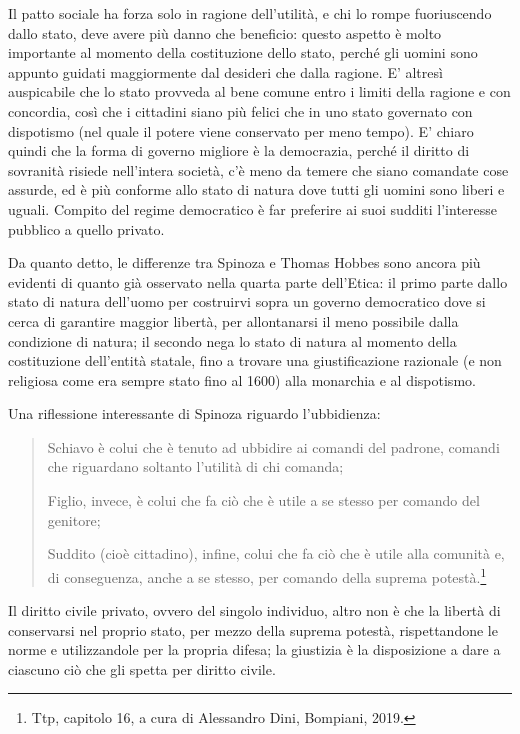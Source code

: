 Il patto sociale ha forza solo in ragione dell'utilità, e chi lo rompe fuoriuscendo dallo stato, deve avere più danno che beneficio: questo aspetto è molto importante al momento della costituzione dello stato, perché gli uomini sono appunto guidati maggiormente dal desideri che dalla ragione. E' altresì auspicabile che lo stato provveda al bene comune entro i limiti della ragione e con concordia, così che i cittadini siano più felici che in uno stato governato con dispotismo (nel quale il potere viene conservato per meno tempo). E' chiaro quindi che la forma di governo migliore è la democrazia, perché il diritto di sovranità risiede nell'intera società, c'è meno da temere che siano comandate cose assurde, ed è più conforme allo stato di natura dove tutti gli uomini sono liberi e uguali. Compito del regime democratico è far preferire ai suoi sudditi l'interesse pubblico a quello privato.

Da quanto detto, le differenze tra Spinoza e Thomas Hobbes sono ancora più evidenti di quanto già osservato nella quarta parte dell'Etica: il primo parte dallo stato di natura dell'uomo per costruirvi sopra un governo democratico dove si cerca di garantire maggior libertà, per allontanarsi il meno possibile dalla condizione di natura; il secondo nega lo stato di natura al momento della costituzione dell'entità statale, fino a trovare una giustificazione razionale (e non religiosa come era sempre stato fino al 1600) alla monarchia e al dispotismo.

Una riflessione interessante di Spinoza riguardo l'ubbidienza:
\begin{quotation}
	\small	
	Schiavo è colui che è tenuto ad ubbidire ai comandi del padrone, comandi che riguardano soltanto l'utilità di chi comanda;
	
	Figlio, invece, è colui che fa ciò che è utile a se stesso per comando del genitore;
		
	Suddito (cioè cittadino), infine, colui che fa ciò che è utile alla comunità e, di conseguenza, anche a se stesso, per comando della suprema potestà.\footnote{Ttp, capitolo 16, a cura di Alessandro Dini, Bompiani, 2019.}
	

\end{quotation}

Il diritto civile privato, ovvero del singolo individuo, altro non è che la libertà di conservarsi nel proprio stato, per mezzo della suprema potestà, rispettandone le norme e utilizzandole per la propria difesa; la giustizia è la disposizione a dare a ciascuno ciò che gli spetta per diritto civile.

